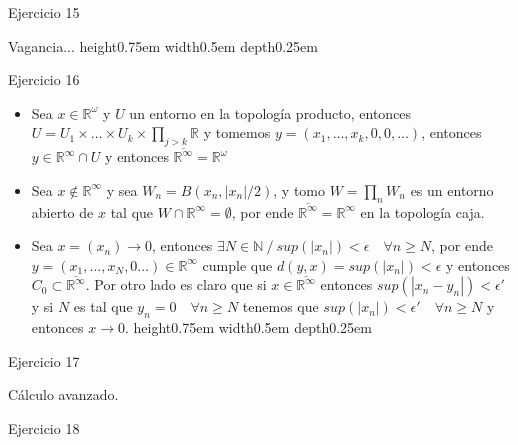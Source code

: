 \documentclass[11pt]{article}
\newcommand{\R}{{\mathbb{R}}}
\newcommand{\N}{{\mathbb{N}}}
\newenvironment{proof}[1][Demostraci\'on]{\begin{trivlist}
\item[\hskip \labelsep {\bfseries #1}]}{\end{trivlist}}
\newcommand{\qed}{\nobreak \ifvmode \relax \else
      \ifdim\lastskip<1.5em \hskip-\lastskip
      \hskip1.5em plus0em minus0.5em \fi \nobreak
      \vrule height0.75em width0.5em depth0.25em\fi}
\begin{document}
\begin{enumerate}
\begin{proof}
\end{proof}

\item {Ejercicio 15}

\begin{proof}

Vagancia... \qed

\end{proof}

\item {Ejercicio 16}

\begin{proof}

\begin{itemize}

\item Sea $x \in \R^{\omega}$ y $U$ un entorno en la topolog\'ia producto, entonces $U = U_1 \times \dots \times U_k \times \prod_{j>k}{\R}$ y tomemos $y = (x_1, \dots, x_k , 0 ,0 , \dots)$, entonces $y \in \R^{\infty} \cap U$ y entonces $\overline{\R^{\infty}} = \R^{\omega}$

\item Sea $x \not \in \R^{\infty}$ y sea $W_n = B(x_n , |x_n|/2)$, y tomo $W = \prod_{n}{W_n}$ es un entorno abierto de $x$ tal que $W \cap \R^{\infty} = \emptyset$, por ende $\overline{\R^{\infty}} = \R^{\infty}$ en la topolog\'ia caja.

\item Sea $x = (x_n) \rightarrow 0$, entonces $\exists N \in \N \ / \ sup(|x_n|)< \epsilon \quad \forall n  \geq N$, por ende $y = (x_1, \dots , x_N , 0 \dots) \in \R^{\infty}$ cumple que $d(y,x) = sup(|x_n|) < \epsilon$ y entonces $C_0 \subset \overline{\R^{\infty}}$. Por otro lado es claro que si $x \in \overline{\R^{\infty}}$ entonces $sup(|x_n-y_n|) < \epsilon'$ y si $N$ es tal que $y_n = 0 \quad \forall n \geq N$ tenemos que $sup(|x_n|) < \epsilon' \quad \forall n \geq N$ y entonces $x \rightarrow 0$. \qed


\end{itemize}

\end{proof}

\item {Ejercicio 17}

\begin{proof}

C\'alculo avanzado.

\end{proof}

\item {Ejercicio 18}


\end{enumerate}
\end{document}
